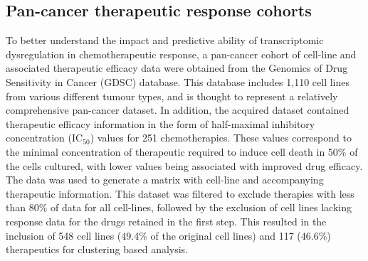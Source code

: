 \documentclass[10pt, letterpaper]{article}
\begin{document}
\begin{multicols}{2}
\subsection*{Pan-cancer therapeutic response cohorts}
To better understand the impact and predictive ability of transcriptomic dysregulation in chemotherapeutic response, a pan-cancer cohort of cell-line and associated therapeutic efficacy data were obtained from the Genomics of Drug Sensitivity in Cancer (GDSC) database. This database includes 1,110 cell lines from various different tumour types, and is thought to represent a relatively comprehensive pan-cancer dataset. In addition, the acquired dataset contained therapeutic efficacy information in the form of half-maximal inhibitory concentration (IC$_{50}$) values for 251 chemotherapies. These values correspond to the minimal concentration of therapeutic required to induce cell death in 50\% of the cells cultured, with lower values being associated with improved drug efficacy. The data was used to generate a matrix with cell-line and accompanying therapeutic information. This dataset was filtered to exclude therapies with less than 80\% of data for all cell-lines, followed by the exclusion of cell lines lacking response data for the drugs retained in the first step. This resulted in the inclusion of 548 cell lines (49.4\% of the original cell lines) and 117 (46.6\%) therapeutics for clustering based analysis.


\begin{figure}[!ht]
    \centering
\end{figure}
\end{multicols}
\end{document}
